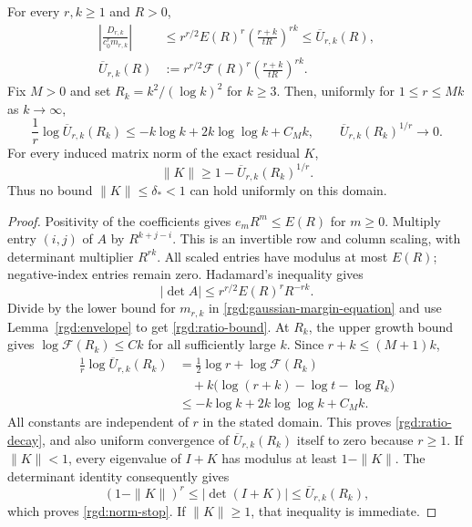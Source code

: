 \begin{theorem}
\label{rgd:gaussian-stop}
For every $r,k\ge1$ and $R>0$,
\begin{align}
 \left|\frac{D_{r,k}}{c_0^rm_{r,k}}\right|
 &\le r^{r/2}E(R)^r\left(\frac{r+k}{tR}\right)^{rk}
 \le\overline U_{r,k}(R),                              \label{rgd:ratio-bound}\\
 \overline U_{r,k}(R)
 &:=r^{r/2}\mathcal F(R)^r
                         \left(\frac{r+k}{tR}\right)^{rk}.
 \nonumber
\end{align}
Fix $M>0$ and set $R_k=k^2/(\log k)^2$ for $k\ge3$.  Then, uniformly
for $1\le r\le Mk$ as $k\to\infty$,
\begin{equation}
 \frac1r\log\overline U_{r,k}(R_k)
 \le-k\log k+2k\log\log k+C_Mk,
 \qquad \overline U_{r,k}(R_k)^{1/r}\longrightarrow0.
 \label{rgd:ratio-decay}
\end{equation}
For every induced matrix norm of the exact residual $K$,
\begin{equation}
 \|K\|\ge1-\overline U_{r,k}(R_k)^{1/r}.
 \label{rgd:norm-stop}
\end{equation}
Thus no bound $\|K\|\le\delta_*<1$ can hold uniformly on this domain.
\end{theorem}
\begin{proof}
Positivity of the coefficients gives $e_mR^m\le E(R)$ for $m\ge0$.
Multiply entry $(i,j)$ of $A$ by $R^{k+j-i}$.  This is an invertible
row and column scaling, with determinant multiplier $R^{rk}$.  All
scaled entries have modulus at most $E(R)$; negative-index entries
remain zero.  Hadamard's inequality gives
\[
 |\det A|\le r^{r/2}E(R)^rR^{-rk}.
\]
Divide by the lower bound for $m_{r,k}$ in
\eqref{rgd:gaussian-margin-equation} and use
Lemma~\ref{rgd:envelope} to get \eqref{rgd:ratio-bound}.
At $R_k$, the upper growth bound gives
$\log\mathcal F(R_k)\le Ck$ for all sufficiently large $k$.
Since $r+k\le(M+1)k$,
\[
 \begin{aligned}
 \frac1r\log\overline U_{r,k}(R_k)
 &=\frac12\log r+\log\mathcal F(R_k)\\
 &\quad+k\bigl(\log(r+k)-\log t-\log R_k\bigr)\\
 &\le-k\log k+2k\log\log k+C_Mk.
 \end{aligned}
\]
All constants are independent of $r$ in the stated domain.  This
proves \eqref{rgd:ratio-decay}, and also uniform convergence of
$\overline U_{r,k}(R_k)$ itself to zero because $r\ge1$.
If $\|K\|<1$, every eigenvalue of $I+K$ has modulus at least
$1-\|K\|$.  The determinant identity consequently gives
\[
 (1-\|K\|)^r\le|\det(I+K)|
      \le\overline U_{r,k}(R_k),
\]
which proves \eqref{rgd:norm-stop}.  If $\|K\|\ge1$, that inequality
is immediate.
\end{proof}

